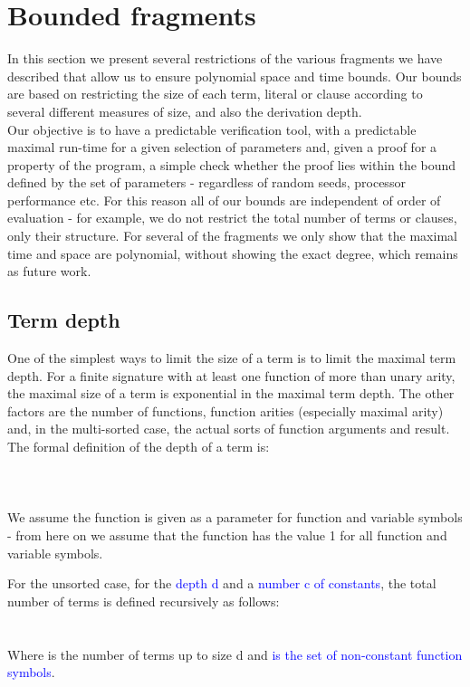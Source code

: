 \chapter{Bounded fragments}\label{chapter:bounds}
In this section we present several restrictions of the various fragments we have described that allow us to ensure polynomial space and time bounds.
Our bounds are based on restricting the size of each term, literal or clause according to several different measures of size, and also the derivation depth.\\
Our objective is to have a predictable verification tool, with a predictable maximal run-time for a given selection of parameters and, given a proof for a property of the program, a simple check whether the proof lies within the bound defined by the set of parameters - regardless of random seeds, processor performance etc. For this reason all of our bounds are independent of order of evaluation - for example, we do not restrict the total number of terms or clauses, only their structure.
For several of the fragments we only show that the maximal time and space are polynomial, without showing the exact degree, which remains as future work.

\section{Term depth}
One of the simplest ways to limit the size of a term is to limit the maximal term depth.
For a finite signature with at least one function of more than unary arity, 
the maximal size of a term is exponential in the maximal term depth.
The other factors are the number of functions, function arities (especially maximal arity) and, 
in the multi-sorted case, the actual sorts of function arguments and result.
The formal definition of the depth of a term is:\\
\\
\\
\\
We assume the function  is given as a parameter for function and variable symbols - 
from here on we assume that the function has the value 1 for all function and variable symbols.

For the unsorted case, for the \textcolor{blue}{depth d} and a \textcolor{blue}{number c of constants}, the total number of terms is defined recursively as follows:\\
\\
\\
Where  is the number of terms up to size d and \textcolor{blue}{ is the set of non-constant function symbols}.

